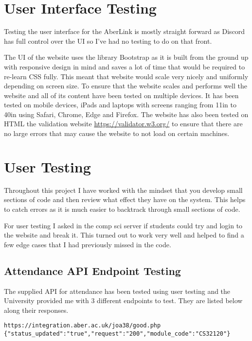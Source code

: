 \section{User Interface Testing}
Testing the user interface for the AberLink is mostly straight forward as Discord has full control over the UI so I've had no testing to do on that front.

The UI of the website uses the library Bootstrap \cite{bootstrap} as it is built from the ground up with responsive design in mind and saves a lot of time that would be required to re-learn CSS fully. This meant that website would scale very nicely and uniformly depending on screen size. To ensure that the website scales and performs well the website and all of its content have been tested on multiple devices. It has been tested on mobile devices, iPads and laptops with screens ranging from 11in to 40in using Safari, Chrome, Edge and Firefox. The website has also been tested on HTML the validation website \href{https://validator.w3.org/}{https://validator.w3.org/} to ensure that there are no large errors that may cause the website to not load on certain machines.

\section{User Testing}\label{sec4:user-tesing}
Throughout this project I have worked with the mindset that you develop small sections of code and then review what effect they have on the system. This helps to catch errors as it is much easier to backtrack through small sections of code.

For user testing I asked in the comp sci server if students could try and login to the website and break it. This turned out to work very well and helped to find a few edge cases that I had previously missed in the code.

\subsection{Attendance API Endpoint Testing}
The supplied API for attendance has been tested using user testing and the University provided me with 3 different endpoints to test. They are listed below along their responses.

\begin{verbatim}
https://integration.aber.ac.uk/joa38/good.php
{"status_updated":"true","request":"200","module_code":"CS32120"}    
\end{verbatim}

